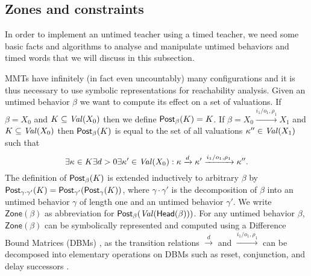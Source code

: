 \newcommand{\Zone}[1]{\mathsf{Zone}({#1})}

\subsection{Zones and constraints}

In order to implement an untimed teacher using a timed teacher, we need some basic facts and algorithms to
analyse and manipulate untimed behaviors and timed words that we will discuss in this subsection.


MMTs have infinitely (in fact even uncountably) many configurations and it is thus necessary to use symbolic representations
for reachability analysis. Given an untimed behavior $\beta$ we want to compute its effect on a set of valuations. 
If $\beta =X_0$ and $K \subseteq\mathit{Val}({X_0})$ then we define $\mathsf{Post}_{\beta}(K) = K$.
If $\beta = X_0 \xrightarrow{i_1/o_1, \rho_1} X_1$ and
$K \subseteq\mathit{Val}({X_0})$ then $\mathsf{Post}_{\beta}(K)$ is equal to the set of all valuations $\kappa'' \in\mathit{Val}({X_1})$ such that
\[
  \exists \kappa \in K \exists d >0 \exists \kappa' \in\mathit{Val}({X_0}) :
 \kappa \xrightarrow{d} \kappa' \xrightarrow{i_1/o_1, \rho_1} \kappa'' .
\]
The definition of $\mathsf{Post}_{\beta}(K)$ is extended inductively to arbitrary $\beta$ by 
$\mathsf{Post}_{\gamma \cdot \gamma'}(K) = \mathsf{Post}_{\gamma'} (\mathsf{Post}_{\gamma}(K))$, where $\gamma \cdot \gamma'$ is the decomposition of
$\beta$ into an untimed behavior $\gamma$ of length one and an untimed behavior $\gamma'$.
We write $\Zone{\beta}$ as abbreviation for $\mathsf{Post}_{\beta}(\mathit{Val}({\mathsf{Head}({\beta})}))$.
%
For any untimed behavior $\beta$, $\Zone{\beta}$ can be symbolically represented and computed using a Difference Bound Matrices (DBMs)
 \cite{Di89}, as the transition relations $\xrightarrow{d}$ and $\xrightarrow{i_1/o_1, \rho_1}$ can be decomposed 
into elementary operations on DBMs such as reset, conjunction, and delay successors \cite{BengtssonY03}.


